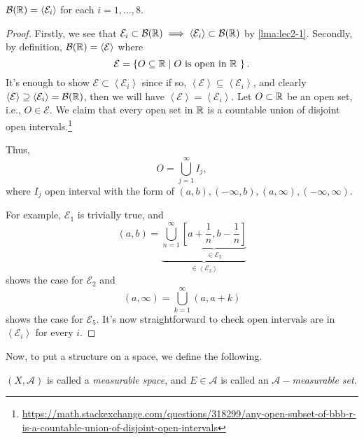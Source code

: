 \begin{proposition}
	\(\mathcal{B} (\mathbb{\MakeUppercase{R}} ) = \left<\mathcal{E}_{i}\right> \) for each \(i = 1, \ldots, 8\).
\end{proposition}
\begin{proof}
	Firstly, we see that \(\mathcal{E} _{i}\subset \mathcal{B} (\mathbb{\MakeUppercase{R}} ) \implies \left<\mathcal{E} _{i}\right>\subset \mathcal{B} (\mathbb{\MakeUppercase{R}} )\) by \autoref{lma:lec2-1}.
	Secondly, by definition, \(\mathcal{B} (\mathbb{\MakeUppercase{R}} ) = \left<\mathcal{E} \right>\) where
	\[
		\mathcal{E} = \left\{O\subseteq \mathbb{\MakeUppercase{R}}\mid O \text{ is open in \(\mathbb{\MakeUppercase{R}}\) } \right\}.
	\]
	It's enough to show \(\mathcal{E} \subset \left<\mathcal{E} _{i}\right>\) since if so, \(\left<\mathcal{E} \right>\subseteq \left<\mathcal{E} _{i}\right>\), and clearly
	\(\left< \mathcal{E}  \right> \supseteq \left< \mathcal{E}_{i} \right> = \mathcal{B} (\mathbb{\MakeUppercase{R}}) \), then we will have
	\(\left< \mathcal{E}\right> = \left< \mathcal{E} _{i} \right> \). Let \(O\subset \mathbb{\MakeUppercase{R}} \) be an open set, i.e., \(O\in\mathcal{E}\).
	We claim that every open set in \(\mathbb{\MakeUppercase{R}} \) is a countable union of disjoint open intervals.\footnote{\url{https://math.stackexchange.com/questions/318299/any-open-subset-of-bbb-r-is-a-countable-union-of-disjoint-open-intervals}}

	Thus,
	\[
		O = \bigcup\limits_{j=1}^{\infty} I_{j},
	\]
	where \(I_{j}\) open interval with the form of \((a, b), (-\infty, b), (a, \infty), (-\infty, \infty)\).

	For example, \(\mathcal{E} _1\) is trivially true, and
	\[
		(a, b) = \underbrace{\bigcup\limits_{n=1}^{\infty} \underbrace{[a+\frac{1}{n}, b-\frac{1}{n}]}_{\in \mathcal{E}_2}}_{\in\left<\mathcal{E} _2\right>}
	\]
	shows the case for \(\mathcal{E} _2\) and
	\[
		(a, \infty) = \bigcup\limits_{k=1}^{\infty} (a, a+k)
	\]
	shows the case for \(\mathcal{E} _5\). It's now straightforward to check open intervals are in \(\left<\mathcal{E} _{i}\right>\) for every \(i\).
\end{proof}

Now, to put a structure on a space, we define the following.
\begin{definition}
	\((X, \mathcal{A})\) is called a \emph{measurable space}, and \(E\in \mathcal{A} \) is called an \emph{\(\mathcal{A}-\)measurable set}.
\end{definition}

